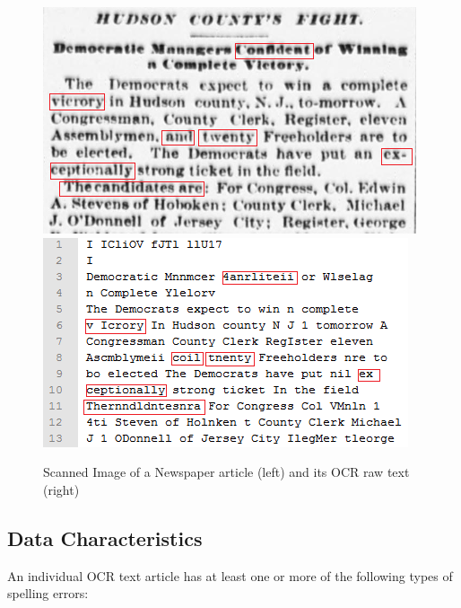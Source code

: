 \documentclass[10pt,journal,compsoc]{IEEEtran}
\begin{document}
\begin{figure}
\includegraphics[scale=0.75]{originalimage}
\includegraphics[scale=0.80]{ocr}
\caption{Scanned Image of a Newspaper article (left) and its OCR raw text (right)}
\label{figure:1}
\end{figure}

\subsection{Data Characteristics}
An individual OCR text article has at least one or more of the following types of spelling errors:
\end{document}
